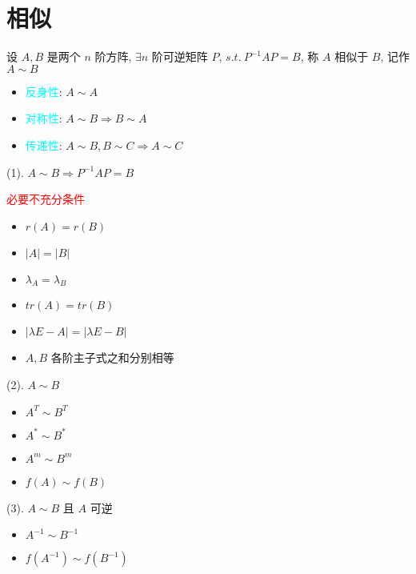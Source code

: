 \section{相似}

\begin{definition}[矩阵的相似]
	设 $A,B$ 是两个 $n$ 阶方阵, $\exists n$ 阶可逆矩阵 $P$, $s.t.\ P^{-1}AP = B$, 称 $A$ 相似于 $B$, 记作 $A\sim B$
\end{definition}

\begin{corollary}[相似矩阵]
	\begin{itemize}
		\item \textcolor{cyan}{反身性}: $A\sim A$
		\item \textcolor{cyan}{对称性}: $A\sim B \Rightarrow B\sim A$
		\item \textcolor{cyan}{传递性}: $A\sim B, B\sim C \Rightarrow A\sim C$
	\end{itemize}
\end{corollary}

\begin{corollary}[相似矩阵]
	(1). $A\sim B\Rightarrow P^{-1}AP = B$

	\textcolor{red}{必要不充分条件}

	\begin{itemize}
		\item $r(A) = r(B)$
		\item $|A| = |B|$
		\item $\lambda_{A} = \lambda_{B}$
		\item $tr(A) = tr(B)$
		\item $|\lambda E-A| = |\lambda E - B|$
		\item $A, B$ 各阶主子式之和分别相等
	\end{itemize}
	
	(2). $A\sim B$
	\begin{itemize}
		\item $A^{T}\sim B^{T}$
		\item $A^{*} \sim B^{*}$
		\item $A^{m}\sim B^{m}$
		\item $f(A)\sim f(B)$
	\end{itemize}
	
	(3). $A\sim B$ 且 $A$ 可逆  
	\begin{itemize}
		\item $A^{-1}\sim B^{-1}$
		\item $f(A^{-1})\sim f(B^{-1})$
	\end{itemize}
\end{corollary}
